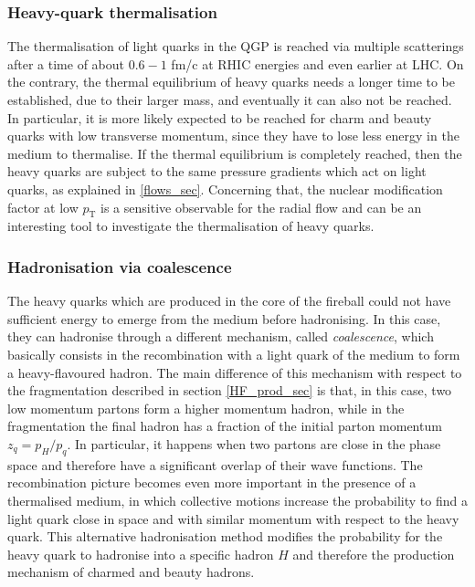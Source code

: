 \documentclass[b5paper,10pt,twoside,oldstyle,classica]{toptesi}
\newcommand{\pt}{p_\text{T}}
\begin{document}
\subsubsection{Heavy-quark thermalisation}
The thermalisation of light quarks in the QGP is reached via multiple scatterings after a time of about $0.6-1$ fm/c at RHIC energies and even earlier at LHC. On the contrary, the thermal equilibrium of heavy quarks needs a longer time to be established, due to their larger mass, and eventually it can also not be reached. In particular, it is  more likely expected to be reached for charm and beauty quarks with low transverse momentum, since they have to lose less energy in the medium to thermalise. If the thermal equilibrium is completely reached, then the heavy quarks are subject to the same pressure gradients which act on light quarks, as explained in \ref{flows_sec}. Concerning that, the nuclear modification factor at low $\pt$ is a sensitive observable for the radial flow and can be an interesting tool to investigate the thermalisation of heavy quarks.
\subsubsection{Hadronisation via coalescence}
The heavy quarks which are produced in the core of the fireball could not have sufficient energy to emerge from the medium before hadronising. In this case, they can hadronise through a different mechanism, called \textit{coalescence}, which basically consists in the recombination with a light quark of the medium to form a heavy-flavoured hadron. The main difference of this mechanism with respect to the fragmentation described in section \ref{HF_prod_sec} is that, in this case, two low momentum partons form a higher momentum hadron, while in the fragmentation the final hadron has a fraction of the initial parton momentum $z_q=p_H/p_q$. In particular, it happens when two partons are close in the phase space and therefore have a significant overlap of their wave functions. The recombination picture becomes even more important in the presence of a thermalised medium, in which collective motions increase the probability to find a light quark close in space and with similar momentum with respect to the heavy quark. This alternative hadronisation method modifies the probability for the heavy quark to hadronise into a specific hadron $H$ and therefore the production mechanism of charmed and beauty hadrons.
\end{document}
